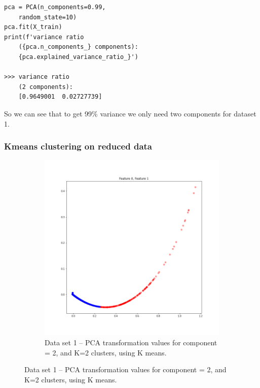 \documentclass[
letterpaper, %
]{IEEEtran}
\begin{document}
	\begin{lstlisting}
pca = PCA(n_components=0.99, 
	random_state=10)
pca.fit(X_train)
print(f'variance ratio 
	({pca.n_components_} components): 
	{pca.explained_variance_ratio_}')
	
>>> variance ratio 
	(2 components): 
	[0.9649001  0.02727739]
	\end{lstlisting}

	So we can see that to get 99\% variance we only need two components for dataset 1.
	
	\subsubsection{Kmeans clustering on reduced data}
	\begin{figure}[!b]
		\begin{subfigure}{1.0\linewidth}
			\centering
			\includegraphics[width=\linewidth]{./images/ds1/pca/cluster/pcacluster.png}
			\caption{Data set 1 -- PCA transformation values for component = 2, and K=2 clusters, using K means.}
			\label{fig:pcads1cluster}
		\end{subfigure}
	\end{figure}
\end{document}
